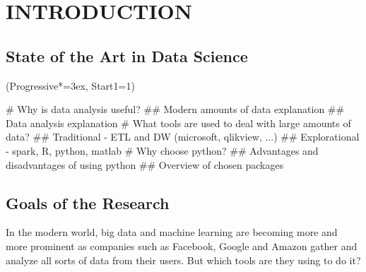 \documentclass[12pt, a4paper]{article}
\let\OldEasylist\easylist
\let\OldEndEasylist\endeasylist
\renewenvironment{easylist}{%
    \OldEasylist%
    \ListProperties(Progressive*=3ex, Start1=1)%
}{%
    \OldEndEasylist%
}%
\begin{document}

\begin{titlepage}
\end{titlepage}

\newpage


\tableofcontents

\newpage
\newpage
{}


\begin{abstract}

\end{abstract}



\newpage
\section{INTRODUCTION}

\subsection{State of the Art in Data Science}
\begin{easylist}
# Why is data analysis useful?
## Modern amounts of data explanation
## Data analysis explanation
# What tools are used to deal with large amounts of data?
## Traditional - ETL and DW (microsoft, qlikview, ...)
## Explorational - spark, R, python, matlab
# Why choose python?
## Advantages and disadvantages of using python
## Overview of chosen packages
\end{easylist}

\subsection{Goals of the Research}
 In the modern world, big data and machine learning are becoming more and more prominent as companies such as Facebook, Google and Amazon gather and analyze all sorts of data from their users. But which tools are they using to do it?
\end{document}
